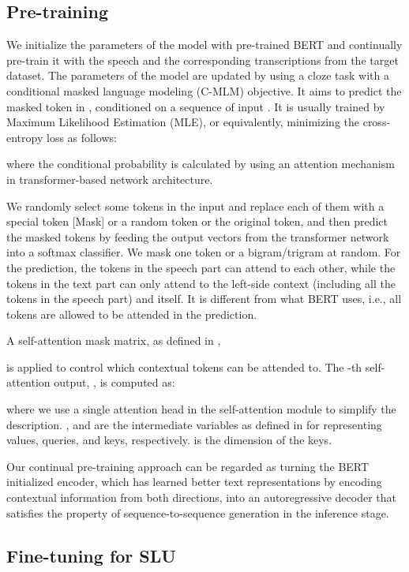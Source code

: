 \documentclass{article}
\begin{document}
\subsection{Pre-training}
\label{ssec:pre-training}
We initialize the parameters of the model with pre-trained BERT and continually pre-train it with the speech and the corresponding transcriptions from the target dataset. The parameters of the model are updated by using a cloze task with a conditional masked language modeling (C-MLM) objective. It aims to predict the masked token  in , conditioned on a sequence of input . It is usually trained by Maximum Likelihood Estimation (MLE), or equivalently, minimizing the cross-entropy loss as follows:

where the conditional probability is calculated by using an attention mechanism in transformer-based network architecture. 

We randomly select some tokens in the input and replace each of them with a special token [Mask] or a random token or the original token, and then predict the masked tokens by feeding the output vectors from the transformer network into a softmax classifier. We mask one token or a bigram/trigram at random. For the prediction, the tokens in the speech part can attend to each other, while the tokens in the text part can only attend to the left-side context (including all the tokens in the speech part) and itself. It is different from what BERT uses, i.e., all tokens are allowed to be attended in the prediction.

A self-attention mask matrix, as defined in \cite{NIPS2019_9464},  

is applied to control which contextual tokens can be attended to. The -th self-attention output, , is computed as:

where we use a single attention head in the self-attention module to simplify the description. , 
and  are the intermediate variables as defined in \cite{NIPS2017_7181} for representing values, queries, and keys, respectively.  is the dimension of the keys. 

Our continual pre-training approach can be regarded as turning the BERT initialized encoder, which has learned better text representations by encoding contextual information from both directions, into an autoregressive decoder that satisfies the property of sequence-to-sequence generation in the inference stage. 

\subsection{Fine-tuning for SLU}
\end{document}
